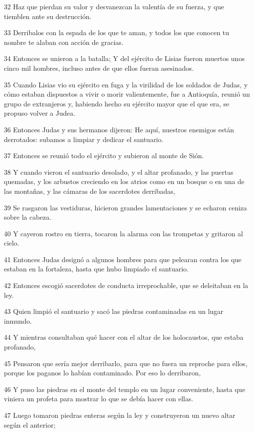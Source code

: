 \par 32 Haz que pierdan su valor y desvanezcan la valentía de su fuerza, y que tiemblen ante su destrucción.
\par 33 Derribalos con la espada de los que te aman, y todos los que conocen tu nombre te alaban con acción de gracias.
\par 34 Entonces se unieron a la batalla; Y del ejército de Lisias fueron muertos unos cinco mil hombres, incluso antes de que ellos fueran asesinados.
\par 35 Cuando Lisias vio su ejército en fuga y la virilidad de los soldados de Judas, y cómo estaban dispuestos a vivir o morir valientemente, fue a Antioquía, reunió un grupo de extranjeros y, habiendo hecho su ejército mayor que el que era, se propuso volver a Judea.
\par 36 Entonces Judas y sus hermanos dijeron: He aquí, nuestros enemigos están derrotados: subamos a limpiar y dedicar el santuario.
\par 37 Entonces se reunió todo el ejército y subieron al monte de Sión.
\par 38 Y cuando vieron el santuario desolado, y el altar profanado, y las puertas quemadas, y los arbustos creciendo en los atrios como en un bosque o en una de las montañas, y las cámaras de los sacerdotes derribadas,
\par 39 Se rasgaron las vestiduras, hicieron grandes lamentaciones y se echaron ceniza sobre la cabeza.
\par 40 Y cayeron rostro en tierra, tocaron la alarma con las trompetas y gritaron al cielo.
\par 41 Entonces Judas designó a algunos hombres para que pelearan contra los que estaban en la fortaleza, hasta que hubo limpiado el santuario.
\par 42 Entonces escogió sacerdotes de conducta irreprochable, que se deleitaban en la ley.
\par 43 Quien limpió el santuario y sacó las piedras contaminadas en un lugar inmundo.
\par 44 Y mientras consultaban qué hacer con el altar de los holocaustos, que estaba profanado,
\par 45 Pensaron que sería mejor derribarlo, para que no fuera un reproche para ellos, porque los paganos lo habían contaminado. Por eso lo derribaron,
\par 46 Y puso las piedras en el monte del templo en un lugar conveniente, hasta que viniera un profeta para mostrar lo que se debía hacer con ellas.
\par 47 Luego tomaron piedras enteras según la ley y construyeron un nuevo altar según el anterior;
